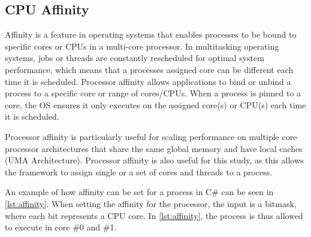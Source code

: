 \subsection{CPU Affinity}

Affinity is a feature in operating systems that enables processes to be bound to specific cores or CPUs in a multi-core processor. In multitasking operating systems, jobs or threads are constantly rescheduled for optimal system performance, which means that a processes assigned core can be different each time it is scheduled. Processor affinity allows applications to bind or unbind a process to a specific core or range of cores/CPUs. When a process is pinned to a core, the OS ensures it only executes on the assigned core(s) or CPU(s) each time it is scheduled.\cite{affinity}



Processor affinity is particularly useful for scaling performance on multiple core processor architectures that share the same global memory and have local caches (UMA Architecture). Processor affinity is also useful for this study, as this allows the framework to assign single or a set of cores and threads to a process.\cite{affinity}\newline

An example of how affinity can be set for a process in C\# can be seen in \cref{lst:affinity}. When setting the affinity for the processor, the input is a bitmask, where each bit represents a CPU core. In \cref{lst:affinity}, the process is thus allowed to execute in core \#0 and \#1.
